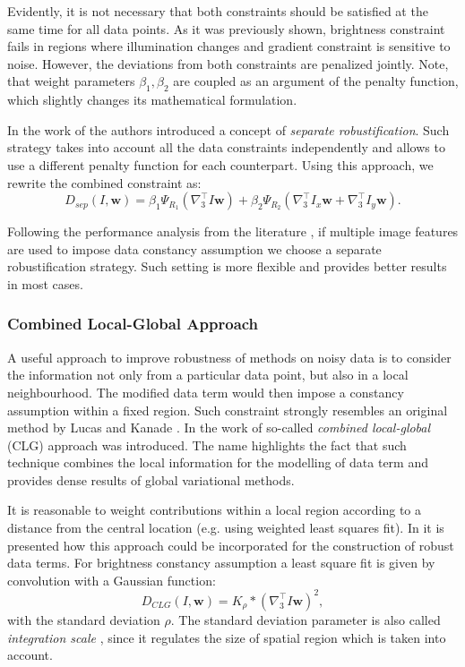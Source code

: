 Evidently, it is not necessary that both constraints should be satisfied at the same time for all data points. As it was previously shown, brightness constraint fails in regions where illumination changes and gradient constraint is sensitive to noise. However, the deviations from both constraints are penalized jointly. Note, that weight parameters $ \beta_1, \beta_2$ are coupled as an argument of the penalty function, which slightly changes its mathematical formulation. 
 
In the work of \cite{Bruhn05b} the authors introduced a concept of \textit{separate robustification}.
Such strategy takes into account all the data constraints independently and allows to use a different penalty function for each counterpart. Using this approach, we rewrite the combined constraint as:
$$ D_{sep}(I,\textbf{w}) =  \beta_{1}\Psi_{R_1}( \nabla_{3}^{\top}I \textbf{w}) + 
\beta_{2} \Psi_{R_2} (\nabla_{3}^{\top}I_{x}\textbf{w} + \nabla_{3}^{\top}I_{y}\textbf{w}). $$
 
Following the performance analysis from the literature \cite{Bruhn05b, HarmonyFlow}, if multiple image features are used to impose data constancy assumption we choose a separate robustification strategy. Such setting is more flexible and provides better results in most cases.

\subsubsection{Combined Local-Global Approach}
\label{clg}

A useful approach to improve robustness of \opticalflow methods on noisy data is to consider the information not only from a particular data point, but also in a local neighbourhood. The modified data term would then impose a constancy assumption within a fixed region. Such constraint strongly resembles an original \opticalflow method by Lucas and Kanade \cite{LucasKanade81}. In the work of \cite{Bruhn02} so-called \textit{combined local-global} (CLG) approach was introduced. The name highlights the fact that such technique combines the local information for the modelling of data term and provides dense results of global variational methods. 

It is reasonable to weight contributions within a local region according to a distance from the central location (e.g. using weighted least squares fit). In \cite{Bruhn02} it is presented how this approach could be incorporated for the construction of robust data terms. For brightness constancy assumption a least square fit is given by convolution with a Gaussian function: 
$$ D_{CLG}(I,\textbf{w}) =  K_{\rho} \ast (\nabla_{3}^{\top}I\textbf{w})^2, $$
with the standard deviation $\rho$. The standard deviation parameter is also called \textit{integration scale} \cite{Bruhn02}, since it regulates the size of spatial region which is taken into account. 

